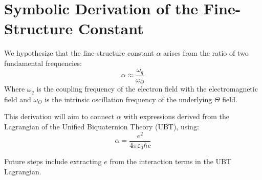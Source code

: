 \documentclass{article}
\begin{document}
\section*{Symbolic Derivation of the Fine-Structure Constant}

We hypothesize that the fine-structure constant $\alpha$ arises from the ratio of two fundamental frequencies:
\[
\alpha \approx \frac{\omega_q}{\omega_\Theta}
\]
Where $\omega_q$ is the coupling frequency of the electron field with the electromagnetic field and $\omega_\Theta$ is the intrinsic oscillation frequency of the underlying $\Theta$ field.

This derivation will aim to connect $\alpha$ with expressions derived from the Lagrangian of the Unified Biquaternion Theory (UBT), using:
\[
\alpha = \frac{e^2}{4\pi \varepsilon_0 \hbar c}
\]

Future steps include extracting $e$ from the interaction terms in the UBT Lagrangian.
\end{document}
